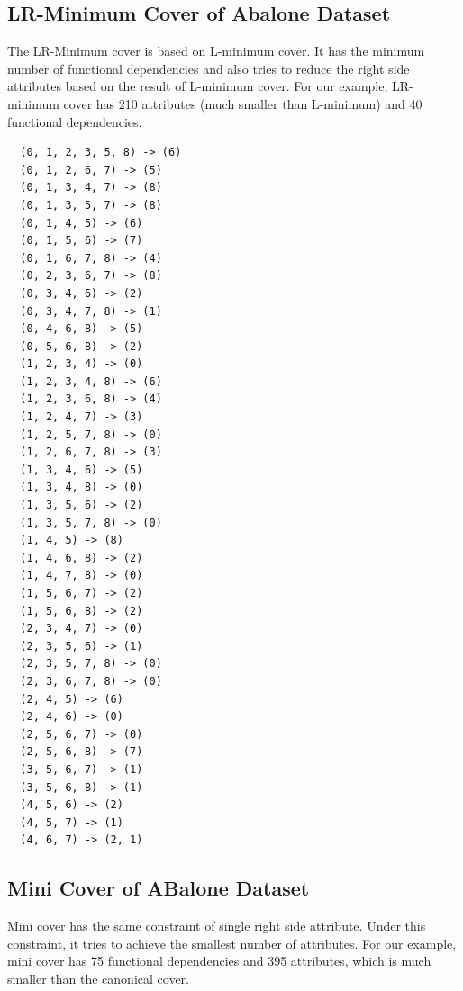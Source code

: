 \documentclass[11pt]{book}
\begin{document}
\subsection{LR-Minimum Cover of Abalone Dataset}

The LR-Minimum cover is based on L-minimum cover. It has the minimum number of functional dependencies and also tries to reduce the right side attributes based on the result of L-minimum cover. For our example, LR-minimum cover has 210 attributes (much smaller than L-minimum) and 40 functional dependencies.

\begin{verbatim}
  (0, 1, 2, 3, 5, 8) -> (6)
  (0, 1, 2, 6, 7) -> (5)
  (0, 1, 3, 4, 7) -> (8)
  (0, 1, 3, 5, 7) -> (8)
  (0, 1, 4, 5) -> (6)
  (0, 1, 5, 6) -> (7)
  (0, 1, 6, 7, 8) -> (4)
  (0, 2, 3, 6, 7) -> (8)
  (0, 3, 4, 6) -> (2)
  (0, 3, 4, 7, 8) -> (1)
  (0, 4, 6, 8) -> (5)
  (0, 5, 6, 8) -> (2)
  (1, 2, 3, 4) -> (0)
  (1, 2, 3, 4, 8) -> (6)
  (1, 2, 3, 6, 8) -> (4)
  (1, 2, 4, 7) -> (3)
  (1, 2, 5, 7, 8) -> (0)
  (1, 2, 6, 7, 8) -> (3)
  (1, 3, 4, 6) -> (5)
  (1, 3, 4, 8) -> (0)
  (1, 3, 5, 6) -> (2)
  (1, 3, 5, 7, 8) -> (0)
  (1, 4, 5) -> (8)
  (1, 4, 6, 8) -> (2)
  (1, 4, 7, 8) -> (0)
  (1, 5, 6, 7) -> (2)
  (1, 5, 6, 8) -> (2)
  (2, 3, 4, 7) -> (0)
  (2, 3, 5, 6) -> (1)
  (2, 3, 5, 7, 8) -> (0)
  (2, 3, 6, 7, 8) -> (0)
  (2, 4, 5) -> (6)
  (2, 4, 6) -> (0)
  (2, 5, 6, 7) -> (0)
  (2, 5, 6, 8) -> (7)
  (3, 5, 6, 7) -> (1)
  (3, 5, 6, 8) -> (1)
  (4, 5, 6) -> (2)
  (4, 5, 7) -> (1)
  (4, 6, 7) -> (2, 1)
\end{verbatim}

\subsection{Mini Cover of ABalone Dataset}

Mini cover has the same constraint of single right side attribute. Under this constraint, it tries to achieve the smallest number of attributes. For our example, mini cover has 75 functional dependencies and 395 attributes, which is much smaller than the canonical cover.
\end{document}
